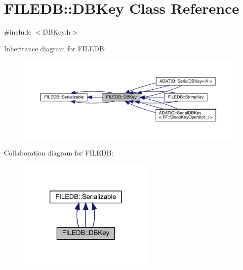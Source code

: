 \hypertarget{classFILEDB_1_1DBKey}{}\section{F\+I\+L\+E\+DB\+:\+:D\+B\+Key Class Reference}
\label{classFILEDB_1_1DBKey}


{\ttfamily \#include $<$D\+B\+Key.\+h$>$}



Inheritance diagram for F\+I\+L\+E\+DB\+:
\nopagebreak
\begin{figure}[H]
\begin{center}
\leavevmode
\includegraphics[width=350pt]{d2/d2b/classFILEDB_1_1DBKey__inherit__graph}
\end{center}
\end{figure}


Collaboration diagram for F\+I\+L\+E\+DB\+:
\nopagebreak
\begin{figure}[H]
\begin{center}
\leavevmode
\includegraphics[width=188pt]{dc/d28/classFILEDB_1_1DBKey__coll__graph}
\end{center}
\end{figure}
